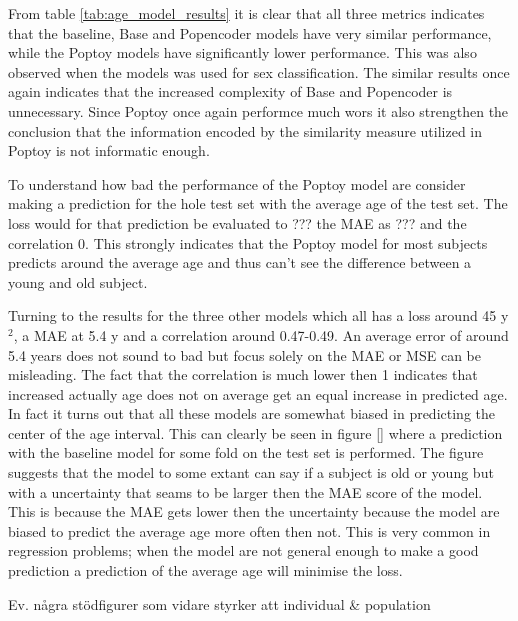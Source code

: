 From table \ref{tab:age_model_results} it is clear that all three metrics indicates that the baseline, Base and Popencoder models have very similar performance, while the Poptoy models have significantly lower performance. This was also observed when the models was used for sex classification. The similar results once again indicates that the increased complexity of Base and Popencoder is unnecessary.  Since Poptoy once again performce much wors it also strengthen the conclusion that the information encoded by the similarity measure utilized in Poptoy is not informatic enough. 

To understand how bad the performance of the Poptoy model are consider making a prediction for the hole test set with the average age of the test set. The loss would for that prediction be evaluated to ??? the MAE as ??? and the correlation 0. This strongly indicates that the Poptoy model for most subjects predicts around the average age and thus can't see the difference between a young and old subject. 

Turning to the results for the three other models which all has a loss around 45 y$^2$, a MAE at 5.4 y and a correlation around 0.47-0.49. An average error of around 5.4 years does not sound to bad but focus solely on the MAE or MSE can be misleading. The fact that the correlation is much lower then 1 indicates that increased actually age does not on average get an equal increase in predicted age. In fact it turns out that all these models are somewhat biased in predicting the center of the age interval. This can clearly be seen in figure \ref{} where a prediction with the baseline model for some fold on the test set is performed. The figure suggests that the model to some extant can say if a subject is old or young but with a uncertainty that seams to be larger then the MAE score of the model. This is because the MAE gets lower then the uncertainty because the model are biased to predict the average age more often then not. 
This is very common in regression problems; when the model are not general enough to make a good prediction a prediction of the average age will minimise the loss.   


Ev. några stödfigurer som vidare styrker att individual \& population 


